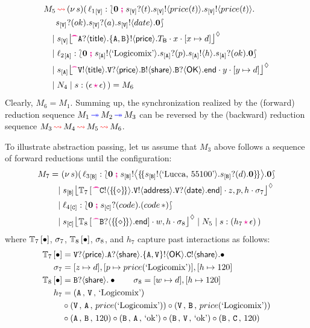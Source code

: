 \documentclass[runningheads,plain]{llncs}
\begin{document}
\begin{align*}
M_5 & \bk  \news{s}(\,  
\np{\key{{\loc_1}}{\pS}}{ \conf{\inact}{\binp{\epS}{t}\bout{\epS}{price(t)}\bout{\epS}{price(t)} \\ 
&   \binp{\epS}{ok}\binp{\epS}{a} \bout{\epS}{date}\inact }} 
\\
&  \!\!\!\! \Par 
 \hmoni{\ep{s}{\pS}}{\!\!\past \ltinp{A}{\mathsf{title}}{\ltout{\{A,B\}}{\mathsf{price}}{T_\mathsf{B}}}}{x}{\upd{x}{d}} 
\\
& \!\!\!\! \Par \np{\key{{\loc_2}}{\pA}}{ \conf{\inact}{\bout{\epA}{\exBook}\binp{\epA}{p}\bout{\epA}{h}\binp{\epA}{ok}\inact}} 
\\
& \!\!\!\!\Par 
\hmoni{\ep{s}{\pA}}{\!\!\past \ltout{\pS}{\mathsf{title}}{\ltinp{\pS}{\mathsf{price}}{\ltout{B}{\mathsf{share}}{\ltinp{B}{\mathsf{OK}}{\lend}}}}}{y}{\upd{y}{d}} 
\\
& \!\!\!\! \Par N_4 \Par \codah{s}{\emp}{\emp}{}~)  = M_6
\end{align*}
Clearly, $M_6 = M_1$.
Summing up, the synchronization realized by the (forward) reduction sequence
$M_1 \textcolor{blue}{\,\twoheadrightarrow\,} M_2 \textcolor{blue}{\,\twoheadrightarrow\,} M_3$ can be reversed by the (backward) reduction sequence
$M_3 \textcolor{red}{\,\rightsquigarrow\,} M_4 \textcolor{red}{\,\rightsquigarrow\,} M_5 \textcolor{red}{\,\rightsquigarrow\,} M_6$.

To illustrate abstraction passing, let us assume that 
$M_3$ above follows a sequence of forward reductions
until the configuration:
\begin{align*}
M_7 = ~ &   \news{s}(\,  \np{\key{{\loc_3}}{\pB}}{ \conf{\inact}{\bbout{\epB}{\thunkp{\bout{\epB}{\text{`Lucca, 55100'}}\binp{\epB}{d}\inact}}\inact}} 
\\
& \!\!\!\! \Par \hmoni{\ep{s}{\pB}}{\myctxr{\ctx{T}_7}{\past \ltout{C}{\thunkt}{\ltout{\pS}{\mathsf{address}}{\ltinp{\pS}{\mathsf{date}}{\lend}}}}}{z,p,h}{\store_7} 
\\
& \!\!\!\! \Par \np{\key{{\loc_4}}{\pC}}{ \conf{\inact}{\binp{\epC}{code}(\appl{code}{\dummyn})}} 
\\
&  \!\!\!\! \Par 
\hmoni{\ep{s}{\pC}}{\myctxr{\ctx{T}_8}{\past \ltinp{B}{\thunkt}{\lend}}}{w,h}{\store_8} 
\Par N_5 \Par \codah{s}{h_7}{\emp}{}~) 
\end{align*}
where 
${\mathbb{T}_7\left[\textcolor{black}{\bullet}\right]}$, $\sigma_7$, ${\mathbb{T}_8\left[\textcolor{black}{\bullet}\right]}$, $\sigma_8$,
and $h_7$ capture past interactions as follows:
\begin{align*}
{\mathbb{T}_7\left[\textcolor{black}{\bullet}\right]} & =
\mathtt{\mathtt{V}}?\langle\mathsf{price}\rangle.\mathtt{A}?\langle\mathsf{share}\rangle.\mathtt{\{A,\mathtt{V}\}}!\langle\mathsf{OK}\rangle.
\mathtt{C}!\langle\mathsf{share}\rangle.\bullet
\\
\sigma_7 & = [z\mapsto d],[p\mapsto price(\text{`Logicomix'})],[h\mapsto 120]
\\
{\mathbb{T}_8\left[\textcolor{black}{\bullet}\right]} & =\mathtt{B}?\langle\mathsf{share}\rangle.\bullet \qquad \sigma_8  = [w\mapsto d],[h\mapsto 120]
\\
h_7 & = 
(\mathtt{A} \,,\, \mathtt{V} \,,\,\text{`Logicomix'})
\\
& \circ
(\mathtt{V} \,,\, \mathtt{A} \,,\,price(\text{`Logicomix'}))
\circ
(\mathtt{V} \,,\, \mathtt{B} \,,\,price(\text{`Logicomix'}))
\\
& \circ
(\mathtt{A} \,,\, \mathtt{B} \,,\,120)
\circ
(\mathtt{B} \,,\, \mathtt{A} \,,\,\text{`ok'})
\circ
(\mathtt{B} \,,\, \mathtt{V} \,,\,\text{`ok'})
\circ
(\mathtt{B} \,,\, \mathtt{C} \,,\,120)
\end{align*}
\end{document}
